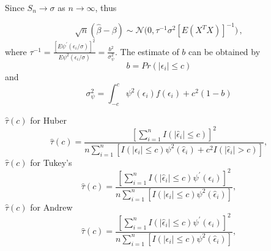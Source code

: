\documentclass[english,svgnames,notes=hide,14pt]{beamer}
\begin{document}
\begin{frame}{}

Since $S_{n} \to \sigma$ as $n \to \infty$, thus

\[
\sqrt{n}(\hat{\beta} - \beta) \sim \mathcal{N} \Big(0, \tau^{-1} \sigma^{2} [E(X^{T}X)]^{-1} \Big)\,,
    \]
where $\tau^{-1} = \frac{[E\psi^{\prime}(\epsilon_{i}/\sigma)]^2}{E \psi^{2}(\epsilon_{i}/\sigma)}=\frac{b^2}{\sigma_\psi^2}$.
The estimate of $b$ can be obtained by
$$b = Pr(|\epsilon_{i}| \leq c)$$ and
$$
\sigma^{2}_{\psi} = \int_{-c}^{c} \psi^{2}(\epsilon_{i}) f(\epsilon_{i}) + c^{2} (1-b)
$$
\end{frame}

\begin{frame}{}
$\hat{\tau}(c)$ for Huber
$$
\hat{\tau}(c) = \frac{[\sum_{i=1}^{n} I(|\hat{\epsilon}_{i}| \leq c)]^2}{n \sum_{i=1}^{n} [I(|\epsilon_{i}| \leq c) \psi^{2} (\hat{\epsilon}_{i}) + c^2 I(|\hat{\epsilon}_{i}| > c)]},
$$
$\hat{\tau}(c)$ for Tukey's
$$
\hat{\tau}(c) = \frac{[\sum_{i=1}^{n} I(|\hat{\epsilon}_{i}| \leq c) \psi^{\prime}(\epsilon_{i})]^2}{n \sum_{i=1}^{n} [I(|\epsilon_{i}| \leq c) \psi^{2} (\hat{\epsilon}_{i})]},
$$
$\hat{\tau}(c)$ for Andrew
$$
\hat{\tau}(c) = \frac{[\sum_{i=1}^{n} I(|\hat{\epsilon}_{i}| \leq c) \psi^{\prime}(\epsilon_{i})]^2}{n \sum_{i=1}^{n} [I(|\epsilon_{i}| \leq c) \psi^{2} (\hat{\epsilon}_{i})]},
$$
\end{frame}
\end{document}
